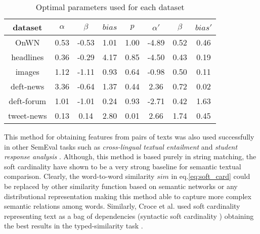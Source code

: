 \begin{table}
\centering{}%
\begin{tabular}{|c|c|c|c|c|c|c|c|}
\hline 
{\footnotesize dataset} & {\footnotesize $\alpha$} & {\footnotesize $\beta$} & {\footnotesize $bias$} & {\footnotesize $p$} & {\footnotesize $\alpha'$} & {\footnotesize $\beta$} & {\footnotesize $bias'$}\tabularnewline
\hline 
\hline 
{\scriptsize OnWN} & {\scriptsize 0.53} & {\scriptsize -0.53} & {\scriptsize 1.01} & {\scriptsize 1.00} & {\scriptsize -4.89} & {\scriptsize 0.52} & {\scriptsize 0.46}\tabularnewline
\hline 
{\scriptsize headlines} & {\scriptsize 0.36} & {\scriptsize -0.29} & {\scriptsize 4.17} & {\scriptsize 0.85} & {\scriptsize -4.50} & {\scriptsize 0.43} & {\scriptsize 0.19}\tabularnewline
\hline 
{\scriptsize images} & {\scriptsize 1.12} & {\scriptsize -1.11} & {\scriptsize 0.93} & {\scriptsize 0.64} & {\scriptsize -0.98} & {\scriptsize 0.50} & {\scriptsize 0.11}\tabularnewline
\hline 
{\scriptsize deft-news} & {\scriptsize 3.36} & {\scriptsize -0.64} & {\scriptsize 1.37} & {\scriptsize 0.44} & {\scriptsize 2.36} & {\scriptsize 0.72} & {\scriptsize 0.02}\tabularnewline
\hline 
{\scriptsize deft-forum} & {\scriptsize 1.01} & {\scriptsize -1.01} & {\scriptsize 0.24} & {\scriptsize 0.93} & {\scriptsize -2.71} & {\scriptsize 0.42} & {\scriptsize 1.63}\tabularnewline
\hline 
{\scriptsize tweet-news} & {\scriptsize 0.13} & {\scriptsize 0.14} & {\scriptsize 2.80} & {\scriptsize 0.01} & {\scriptsize 2.66} & {\scriptsize 1.74} & {\scriptsize 0.45}\tabularnewline
\hline 
\end{tabular}\caption{Optimal parameters used for each dataset\label{tab:Optimal-parameters}}
\end{table}
This method for obtaining features from pairs of texts was also used
successfully in other SemEval tasks such as \emph{cross-lingual textual
entailment }and \emph{student response analysis} \cite{jimenez_soft_2012-1,jimenez_sergio_softcardinality:_2013,jimenez_softcardinality:_2013}.
Although, this method is based purely in string matching, the soft
cardinality have shown to be a very strong baseline for semantic textual
comparison. Clearly, the word-to-word similarity $sim$ in eq.\ref{eq:soft_card}
could be replaced by other similarity function based on semantic networks
or any distributional representation making this method able to capture
more complex semantic relations among words. Similarly, Croce et al.
used soft cardinality representing text as a bag of dependencies (syntactic
soft cardinality \cite{croce_distributional_2012}) obtaining the
best results in the typed-similarity task \cite{croce_unitor-core_2013}. 

